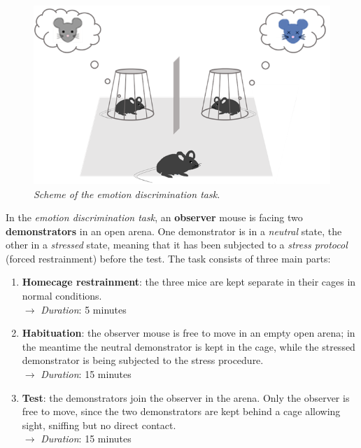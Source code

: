 \documentclass[12pt, a4paper]{report}
\begin{document}
\begin{figure}[H]
	\begin{center}
		\includegraphics[scale=.65]{emotion_discrimination.png} 
	\end{center} 
	\caption{\textit{Scheme of the emotion discrimination task.}}
	
\end{figure}

In the \textit{emotion discrimination task}, an \textbf{observer} mouse is facing two \textbf{demonstrators} in an open arena. One demonstrator is in a \textit{neutral} state, the other in a \textit{stressed} state, meaning that it has been subjected to a \textit{stress protocol} (forced restrainment) before the test. The task consists of three main parts:

\begin{enumerate}
	
	\item \textbf{Homecage restrainment}: the three mice are kept separate in their cages in normal conditions. \\
	$\longrightarrow$ \textit{Duration}: 5 minutes
	
	\item \textbf{Habituation}: the observer mouse is free to move in an empty open arena; in the meantime the neutral demonstrator is kept in the cage, while the stressed demonstrator is being subjected to the stress procedure. \\
	$\longrightarrow$  \textit{Duration}: 15 minutes
	
	\item \textbf{Test}: the demonstrators join the observer in the arena. Only the observer is free to move, since the two demonstrators are kept behind a cage allowing sight, sniffing but no direct contact. \\
	$\longrightarrow$  \textit{Duration}: 15 minutes
\end{enumerate}
\end{document}

